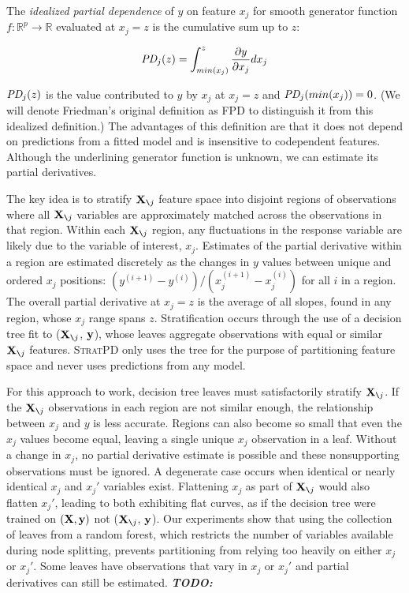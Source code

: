 \documentclass{article}
\newcommand{\todo}[1]{{\bf\em TODO:} {{\color{red}{#1}}}}
\newcommand{\spd}{\fontfamily{cmr}\textsc{\small StratPD}}
\newcommand{\xnj}{${\bf X}_{\texttt{\char`\\}j}$}
\newcommand{\yi}{y^{(i)}}
\begin{document}
 The {\em idealized partial dependence} of $y$ on feature $x_j$ for smooth generator function $f:\mathbb{R}^{p} \rightarrow \mathbb{R}$ evaluated at $x_j = z$ is the cumulative sum up to $z$:

\begin{equation}\label{eq:pd}
\text{\it PD}_j(z) = \int_{min(x_j)}^z \frac{\partial y}{\partial x_j} dx_j
\end{equation}

$\text{\it PD}_j(z)$ is the value contributed to $y$ by $x_j$ at $x_j = z$ and $\text{\it PD}_j(min(x_j))=0$. (We will denote Friedman's original definition as FPD to distinguish it from this idealized definition.) The advantages of this definition are that it does not depend on predictions from a fitted model and is insensitive to codependent features.  Although the underlining generator function is unknown, we can estimate its partial derivatives.

The key idea is to stratify \xnj{} feature space into disjoint regions of observations where all \xnj{} variables are approximately matched across the observations in that region. Within each \xnj{} region, any fluctuations in the response variable are likely due to the variable of interest, $x_j$.  Estimates of the partial derivative within a region are estimated discretely as the changes in $y$ values between unique and ordered $x_j$ positions:  $(y^{(i+1)} - \yi)/(x_j^{(i+1)} - x_j^{(i)})$ for all $i$ in a region. The overall partial derivative at $x_j=z$ is the average of all slopes, found in any region, whose $x_j$ range spans $z$.  Stratification occurs through the use of a decision tree fit to (\xnj, $\bf y$), whose leaves aggregate observations with equal or similar \xnj{} features. \spd{} only uses the tree for the purpose of partitioning feature space and never uses predictions from any model. 

For this approach to work, decision tree leaves must satisfactorily stratify \xnj{}. If the \xnj{} observations in each region are not similar enough, the relationship between $x_j$ and $y$   is less accurate.  Regions can also become so small that even the $x_j$ values become equal, leaving a single unique $x_j$ observation in a leaf. Without a change in $x_j$, no partial derivative estimate is possible and these nonsupporting observations must be  ignored. A degenerate case occurs when identical or nearly identical $x_j$ and $x_j'$ variables exist. Flattening $x_j$ as part of \xnj{} would also flatten $x_j'$, leading to both exhibiting flat curves, as if the decision tree were trained on $(\bf X, y)$ not (\xnj, $\bf y$). Our experiments show that using the collection of leaves from a random forest, which restricts the number of variables available during node splitting, prevents partitioning from relying too heavily on either $x_j$ or $x_j'$. Some leaves have observations that vary in $x_j$ or $x_j'$ and partial derivatives can still be estimated. \todo{maybe talk about how PD/ICE on RF underestimates the curve.}
\end{document}
